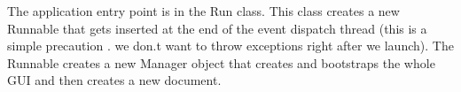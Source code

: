 \tab The application entry point is in the Run class. This class creates a new Runnable that gets inserted at the end of the event dispatch thread (this is a simple precaution . we don.t want to throw exceptions right after we launch). The Runnable creates a new Manager object that creates and bootstraps the whole GUI and then creates a new document.

